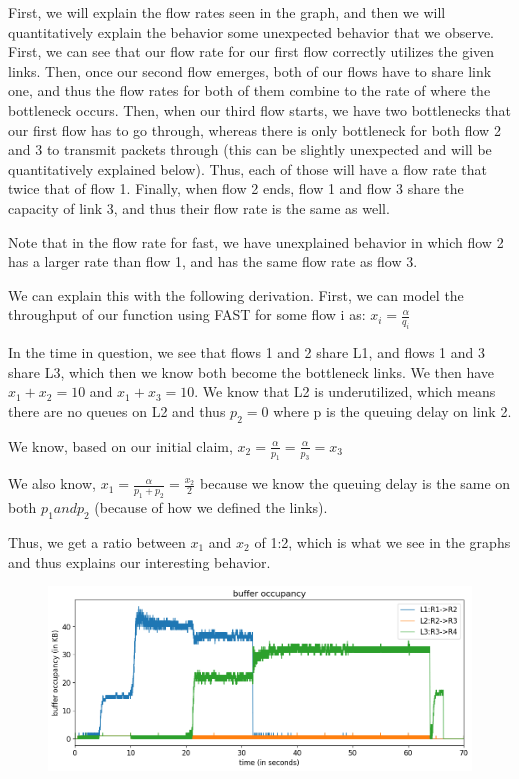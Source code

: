 \documentclass{article}
\begin{document}
First, we will explain the flow rates seen in the graph, and then we will quantitatively explain the behavior some unexpected behavior that we observe. First, we can see that our flow rate for our first flow correctly utilizes the given links. Then, once our second flow emerges, both of our flows have to share link one, and thus the flow rates for both of them combine to the rate of where the bottleneck occurs. Then, when our third flow starts, we have two bottlenecks that our first flow has to go through, whereas there is only bottleneck for both flow 2 and 3 to transmit packets through (this can be slightly unexpected and will be quantitatively explained below). Thus, each of those will have a flow rate that twice that of flow 1. Finally, when flow 2 ends, flow 1 and flow 3 share the capacity of link 3, and thus their flow rate is the same as well. 

Note that in the flow rate for fast, we have unexplained behavior in which flow 2 has a larger rate than flow 1, and has the same flow rate as flow 3. 

We can explain this with the following derivation. First, we can model the throughput of our function using FAST for some flow i as: $ x_i = \frac{\alpha}{q_i} $

In the time in question, we see that flows 1 and 2 share L1, and flows 1 and 3 share L3, which then we know both become the bottleneck links. We then have $x_1 + x_2 = 10 $ and $x_1 + x_3 = 10 $. We know that L2 is underutilized, which means there are no queues on L2 and thus $p_2 = 0 $ where p is the queuing delay on link 2.

We know, based on our initial claim, $ x_2 = \frac{\alpha}{p_1} = \frac{\alpha}{p_3}  = x_3$

We also know, $x_1 = \frac{\alpha}{p_1 + p_2} = \frac{x_2}{ 2}$ because we know the queuing delay is the same on both $p_1 and p_2$ (because of how we defined the links).

Thus, we get a ratio between $x_1$ and $x_2$ of 1:2, which is what we see in the graphs and thus explains our interesting behavior.

\begin{figure}[H]
\centering
\includegraphics[width = \textwidth]{test_case2_fast buffer occupancy.png}
\end{figure}
\end{document}
